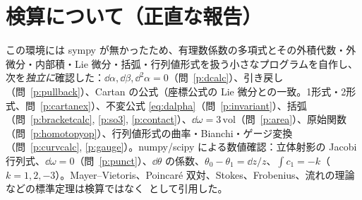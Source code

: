 \section*{検算について（正直な報告）}
この環境には sympy が無かったため、有理数係数の多項式とその外積代数・外微分・内部積・Lie 微分・括弧・行列値形式を扱う小さなプログラムを自作し、次を\emph{独立に}確認した：$\dd\alpha,\dd\beta,\dd^2\alpha=0$（問~\ref{p:dcalc}）、引き戻し（問~\ref{p:pullback}）、Cartan の公式（座標公式の Lie 微分との一致。1形式・2形式、問~\ref{p:cartanex}）、不変公式 \eqref{eq:dalpha}（問~\ref{p:invariant}）、括弧（問~\ref{p:bracketcalc}, \ref{p:so3}, \ref{p:contact}）、$\dd\omega=3\,\mathrm{vol}$（問~\ref{p:area}）、原始関数（問~\ref{p:homotopyop}）、行列値形式の曲率・Bianchi・ゲージ変換（問~\ref{p:curvcalc}, \ref{p:gauge}）。numpy/scipy による数値確認：立体射影の Jacobi 行列式、$\dd\omega=0$（問~\ref{p:punct}）、$\dd\theta$ の係数、$\theta_0-\theta_1=\dd z/z$、$\int c_1=-k$（$k=1,2,-3$）。Mayer--Vietoris、Poincar\'e 双対、Stokes、Frobenius、流れの理論などの標準定理は検算ではなく\tC\ として引用した。
